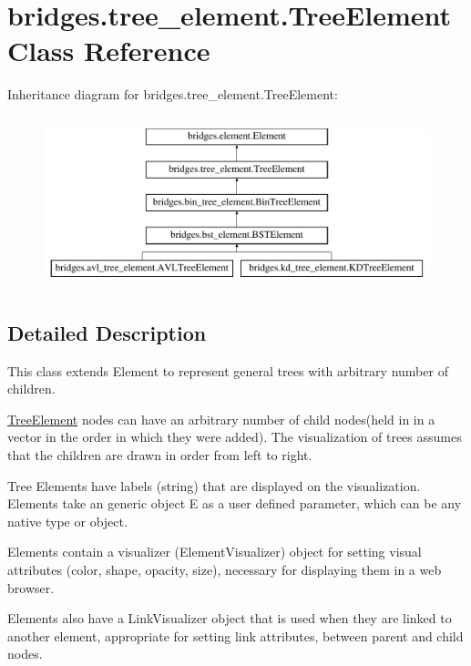 \hypertarget{classbridges_1_1tree__element_1_1_tree_element}{}\section{bridges.\+tree\+\_\+element.\+Tree\+Element Class Reference}
\label{classbridges_1_1tree__element_1_1_tree_element}
Inheritance diagram for bridges.\+tree\+\_\+element.\+Tree\+Element\+:\begin{figure}[H]
\begin{center}
\leavevmode
\includegraphics[height=5.000000cm]{classbridges_1_1tree__element_1_1_tree_element}
\end{center}
\end{figure}


\subsection{Detailed Description}
This class extends Element to represent general trees with arbitrary number of children. 

\mbox{\hyperlink{classbridges_1_1tree__element_1_1_tree_element}{Tree\+Element}} nodes can have an arbitrary number of child nodes(held in in a vector in the order in which they were added). The visualization of trees assumes that the children are drawn in order from left to right.

Tree Elements have labels (string) that are displayed on the visualization. Elements take an generic object E as a user defined parameter, which can be any native type or object.

Elements contain a visualizer (Element\+Visualizer) object for setting visual attributes (color, shape, opacity, size), necessary for displaying them in a web browser.

Elements also have a Link\+Visualizer object that is used when they are linked to another element, appropriate for setting link attributes, between parent and child nodes.


